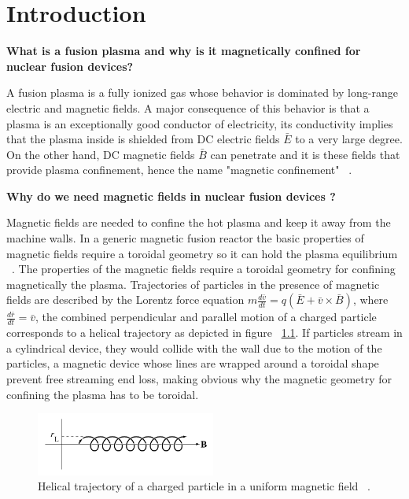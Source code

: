 \chapter{Introduction}

\textbf{What is a fusion plasma and why is it magnetically confined for nuclear fusion devices?}

A fusion plasma is a fully ionized gas whose behavior is dominated by long-range electric and magnetic fields. A major consequence of this behavior is that a plasma is an exceptionally good conductor of electricity, its conductivity implies that the plasma inside is shielded from DC electric fields $\bar{E}$ to a very large degree. On the other hand, DC magnetic fields $\bar{B}$ can penetrate and it is these fields that provide plasma confinement, hence the name "magnetic confinement" ~\cite[Chapter~6]{Freidberg2007}.\smallskip

\textbf{Why do we need magnetic fields in nuclear fusion devices ?}
\smallskip

Magnetic fields are needed to confine the hot plasma and keep it away from the machine walls.  In a generic magnetic fusion reactor the basic properties of magnetic fields require  a toroidal geometry so it can hold the plasma equilibrium ~\cite[Chapter~4]{Freidberg2007}. The properties of the magnetic fields require a toroidal geometry for confining magnetically the plasma. Trajectories of particles in the presence of magnetic fields are described by the Lorentz force equation $m \frac{d\bar{v}}{dt}=q(\bar{E}+\bar{v}\times \bar{B})$, where $\frac{d\bar{r}}{dt}=\bar{v}$, the combined perpendicular and parallel motion of a charged particle corresponds to a helical trajectory as  depicted in figure ~\ref{Helical}. If particles stream in a cylindrical device, they would collide with the wall due to the motion of the particles, a magnetic device whose lines are wrapped around  a toroidal shape  prevent free streaming end loss, making obvious why the magnetic geometry for confining the plasma has to be toroidal.\smallskip

\begin{figure}
	\centering
	\includegraphics[width=0.525\textwidth]{Chp1/Helical_tray.png}
	\caption{  Helical trajectory of a charged particle in a uniform magnetic field ~\cite[Chapter~8]{Freidberg2007}.\label{Helical}}
\end{figure}

